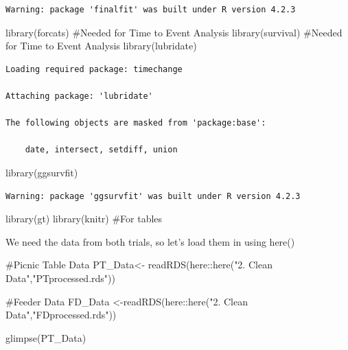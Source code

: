 \documentclass[
  letterpaper,
  DIV=11,
  numbers=noendperiod]{scrartcl}
\newenvironment{Shaded}{}{}
\newcommand{\CommentTok}[1]{\textcolor[rgb]{0.42,0.45,0.49}{#1}}
\newcommand{\FunctionTok}[1]{\textcolor[rgb]{0.44,0.26,0.76}{#1}}
\newcommand{\NormalTok}[1]{\textcolor[rgb]{0.14,0.16,0.18}{#1}}
\newcommand{\OtherTok}[1]{\textcolor[rgb]{0.44,0.26,0.76}{#1}}
\newcommand{\SpecialCharTok}[1]{\textcolor[rgb]{0.00,0.36,0.77}{#1}}
\newcommand{\StringTok}[1]{\textcolor[rgb]{0.01,0.18,0.38}{#1}}
\begin{document}
\begin{verbatim}
Warning: package 'finalfit' was built under R version 4.2.3
\end{verbatim}

\begin{Shaded}
\begin{Highlighting}[]
\FunctionTok{library}\NormalTok{(forcats) }\CommentTok{\#Needed for Time to Event Analysis }
\FunctionTok{library}\NormalTok{(survival) }\CommentTok{\#Needed for Time to Event Analysis }
\FunctionTok{library}\NormalTok{(lubridate)}
\end{Highlighting}
\end{Shaded}

\begin{verbatim}
Loading required package: timechange

Attaching package: 'lubridate'

The following objects are masked from 'package:base':

    date, intersect, setdiff, union
\end{verbatim}

\begin{Shaded}
\begin{Highlighting}[]
\FunctionTok{library}\NormalTok{(ggsurvfit)}
\end{Highlighting}
\end{Shaded}

\begin{verbatim}
Warning: package 'ggsurvfit' was built under R version 4.2.3
\end{verbatim}

\begin{Shaded}
\begin{Highlighting}[]
\FunctionTok{library}\NormalTok{(gt)}
\FunctionTok{library}\NormalTok{(knitr) }\CommentTok{\#For tables}
\end{Highlighting}
\end{Shaded}

We need the data from both trials, so let's load them in using here()

\begin{Shaded}
\begin{Highlighting}[]
\CommentTok{\#Picnic Table Data}
\NormalTok{PT\_Data}\OtherTok{\textless{}{-}} \FunctionTok{readRDS}\NormalTok{(here}\SpecialCharTok{::}\FunctionTok{here}\NormalTok{(}\StringTok{"2. Clean Data"}\NormalTok{,}\StringTok{"PTprocessed.rds"}\NormalTok{))}

\CommentTok{\#Feeder Data }
\NormalTok{FD\_Data }\OtherTok{\textless{}{-}}\FunctionTok{readRDS}\NormalTok{(here}\SpecialCharTok{::}\FunctionTok{here}\NormalTok{(}\StringTok{"2. Clean Data"}\NormalTok{,}\StringTok{"FDprocessed.rds"}\NormalTok{))}

\FunctionTok{glimpse}\NormalTok{(PT\_Data)}
\end{Highlighting}
\end{Shaded}
\end{document}

